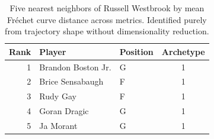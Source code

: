 \begin{table}[htbp]
  \centering\small
  \begin{tabular}{rllc}
    \toprule
    Rank & Player & Position & Archetype \\
    \midrule
    1 & Brandon Boston Jr. & G & 1 \\
    2 & Brice Sensabaugh & F & 1 \\
    3 & Rudy Gay & F & 1 \\
    4 & Goran Dragic & G & 1 \\
    5 & Ja Morant & G & 1 \\
    \bottomrule
  \end{tabular}
  \caption{Five nearest neighbors of Russell Westbrook by mean Fr\'{e}chet curve distance across metrics. Identified purely from trajectory shape without dimensionality reduction.}
  \label{tab:Russell_Westbrook_frechet_curve_neighbors}
\end{table}

